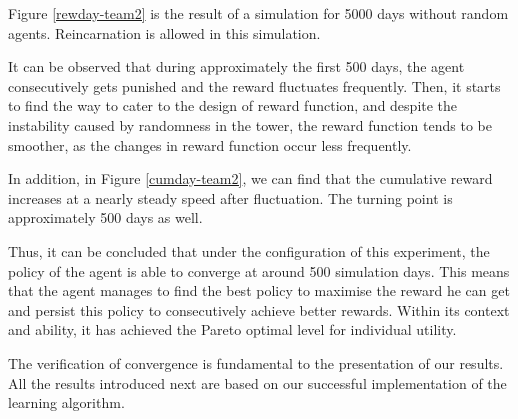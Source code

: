 Figure \ref{rewday-team2} is the result of a simulation for 5000 days without random agents. Reincarnation is allowed in this simulation. 

It can be observed that during approximately the first 500 days, the agent consecutively gets punished and the reward fluctuates frequently. Then, it starts to find the way to cater to the design of reward function, and despite the instability caused by randomness in the tower, the reward function tends to be smoother, as the changes in reward function occur less frequently. 

In addition, in Figure \ref{cumday-team2}, we can find that the cumulative reward increases at a nearly steady speed after fluctuation. The turning point is approximately 500 days as well.

Thus, it can be concluded that under the configuration of this experiment, the policy of the agent is able to converge at around 500 simulation days. This means that the agent manages to find the best policy to maximise the reward he can get and persist this policy to consecutively achieve better rewards. Within its context and ability, it has achieved the Pareto optimal level for individual utility.

The verification of convergence is fundamental to the presentation of our results. All the results introduced next are based on our successful implementation of the learning algorithm.

